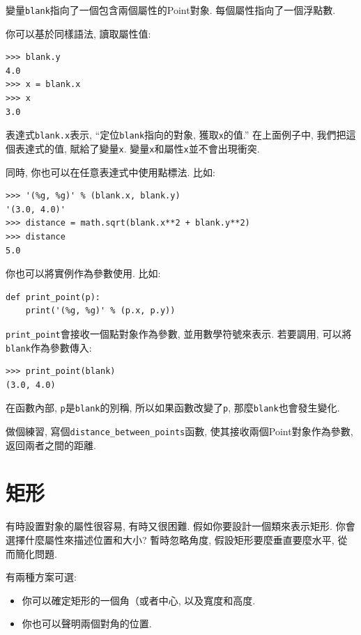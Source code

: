 \documentclass[10pt]{book}
\begin{document}
變量{\tt blank}指向了一個包含兩個屬性的Point對象. 
每個屬性指向了一個浮點數. 

你可以基於同樣語法, 讀取屬性值:

\begin{verbatim}
>>> blank.y
4.0
>>> x = blank.x
>>> x
3.0
\end{verbatim}
%
表達式{\tt blank.x}表示, ``定位{\tt blank}指向的對象, 獲取{\tt x}的值.''
在上面例子中,  我們把這個表達式的值, 賦給了變量{\tt x}. 
變量{\tt x}和屬性{\tt x}並不會出現衝突. 

同時, 你也可以在任意表達式中使用點標法. 比如:

\begin{verbatim}
>>> '(%g, %g)' % (blank.x, blank.y)
'(3.0, 4.0)'
>>> distance = math.sqrt(blank.x**2 + blank.y**2)
>>> distance
5.0
\end{verbatim}
%
你也可以將實例作為參數使用. 比如:

\begin{verbatim}
def print_point(p):
    print('(%g, %g)' % (p.x, p.y))
\end{verbatim}
%
\verb"print_point"會接收一個點對象作為參數, 並用數學符號來表示. 
若要調用, 可以將{\tt blank}作為參數傳入:

\begin{verbatim}
>>> print_point(blank)
(3.0, 4.0)
\end{verbatim}
%
在函數內部, {\tt p}是{\tt blank}的別稱, 所以如果函數改變了{\tt p}, 
那麼{\tt blank}也會發生變化. 

做個練習, 寫個\verb"distance_between_points"函數, 
使其接收兩個Point對象作為參數, 返回兩者之間的距離. 



\section{矩形}
\label{rectangles}

有時設置對象的屬性很容易, 有時又很困難. 
假如你要設計一個類來表示矩形. 你會選擇什麼屬性來描述位置和大小?
暫時忽略角度, 假設矩形要麼垂直要麼水平, 從而簡化問題. 

有兩種方案可選: 

\begin{itemize}

\item 你可以確定矩形的一個角（或者中心, 以及寬度和高度. 

\item 你也可以聲明兩個對角的位置. 

\end{itemize}
\end{document}
